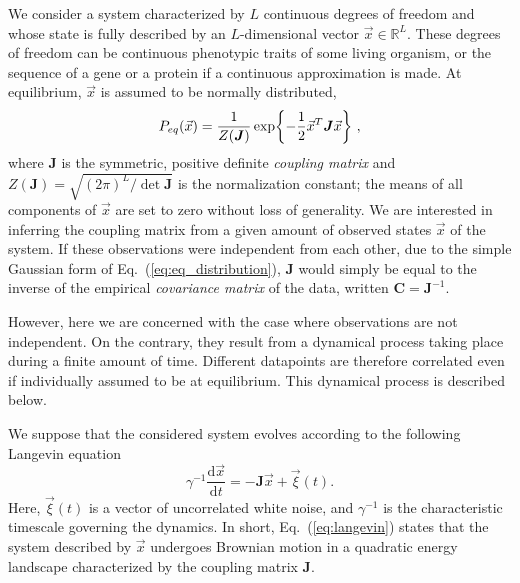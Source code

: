 \documentclass[preprint,amsmath,amssymb,superscriptaddress,showpacs,pre]{revtex4-1}
\let\originalleft\left
\let\originalright\right
\renewcommand{\left}{\mathopen{}\mathclose\bgroup\originalleft}
\renewcommand{\right}{\aftergroup\egroup\originalright}
\def\vx{\vec x}
\newcommand{\curlynormal}[1]{\exp\left\{-\frac{1}{2} #1 \right\}}
\begin{document}
We consider a system characterized by $L$ continuous degrees of freedom and whose state is fully described by an $L$-dimensional vector $\vx\in\mathbb{R}^L$. These degrees of freedom can be continuous phenotypic traits of some living organism, or the sequence of a gene or a protein if a continuous approximation is made. 
At equilibrium, $\vx$ is assumed to be normally distributed,
\begin{equation}
	P_{eq}(\vx) = \frac{1}{Z(\bm{J})}\curlynormal{\vx^T\bm{J}\vx}\ ,
	\label{eq:eq_distribution}
\end{equation}
where $\bm{J}$ is the symmetric, positive definite \emph{coupling matrix} and $Z(\bm{J}) = \sqrt{(2\pi)^L/\det \bm{J}}$ is the normalization constant; the means of all components of $\vx$ are set to zero without loss of generality. 
We are interested in inferring the coupling matrix from a given amount of observed states $\vx$ of the system.
If these observations were independent from each other, due to the simple Gaussian form of Eq.~(\ref{eq:eq_distribution}), $\bm{J}$ would simply be equal to the inverse of the empirical \emph{covariance matrix} of the data, written $\bm{C}=\bm{J}^{-1}$. 

However, here we are concerned with the case where observations are not independent. 
On the contrary, they result from a dynamical process taking place during a finite amount of time. 
Different datapoints are therefore correlated even if individually assumed to be at equilibrium. 
This dynamical process is described below.

We suppose that the considered system evolves according to the following Langevin equation 
\begin{equation}
	\gamma^{-1}\frac{\text{d}\vx}{\text{d}t} = - \bm{J}\vx + \vec{\xi}(t).
	\label{eq:langevin}
\end{equation}
Here, $\vec{\xi}(t)$ is a vector of uncorrelated white noise, and $\gamma^{-1}$ is the characteristic timescale governing the dynamics. 
In short, Eq.~(\ref{eq:langevin}) states that the system described by $\vx$ undergoes Brownian motion in a quadratic energy landscape characterized by the coupling matrix $\bm{J}$. 
\end{document}
